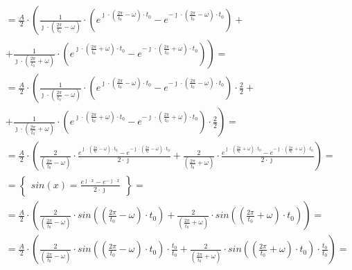 \begin{task}
\begin{align*}
&=\frac{A}{2} \cdot \left(  \frac{1}{\jmath \cdot \left(\frac{2\pi}{t_0} - \omega \right)} \cdot \left( e^{\jmath \cdot \left(\frac{2\pi}{t_0} - \omega \right) \cdot t_0 } - e^{-\jmath \cdot \left(\frac{2\pi}{t_0} - \omega \right) \cdot t_0 } \right) \right.+\\
&\left.+ \frac{1}{\jmath \cdot \left(\frac{2\pi}{t_0} + \omega \right)} \cdot \left(e^{\jmath \cdot \left(\frac{2\pi}{t_0} + \omega \right) \cdot t_0} - e^{-\jmath \cdot \left(\frac{2\pi}{t_0} + \omega \right) \cdot t_0}\right) \right)=\\
&=\frac{A}{2} \cdot \left(  \frac{1}{\jmath \cdot \left(\frac{2\pi}{t_0} - \omega \right)} \cdot \left( e^{\jmath \cdot \left(\frac{2\pi}{t_0} - \omega \right) \cdot t_0 } - e^{-\jmath \cdot \left(\frac{2\pi}{t_0} - \omega \right) \cdot t_0 } \right)\cdot \frac{2}{2} \right.+\\
&\left.+ \frac{1}{\jmath \cdot \left(\frac{2\pi}{t_0} + \omega \right)} \cdot \left(e^{\jmath \cdot \left(\frac{2\pi}{t_0} + \omega \right) \cdot t_0} - e^{-\jmath \cdot \left(\frac{2\pi}{t_0} + \omega \right) \cdot t_0}\right) \cdot \frac{2}{2} \right)=\\%
&=\frac{A}{2} \cdot \left(  \frac{2}{\left(\frac{2\pi}{t_0} - \omega \right)} \cdot \frac{e^{\jmath \cdot \left(\frac{2\pi}{t_0} - \omega \right) \cdot t_0 } - e^{-\jmath \cdot \left(\frac{2\pi}{t_0} - \omega \right) \cdot t_0 } }{2 \cdot \jmath}  + \frac{2}{\left(\frac{2\pi}{t_0} + \omega \right)} \cdot \frac{e^{\jmath \cdot \left(\frac{2\pi}{t_0} + \omega \right) \cdot t_0} - e^{-\jmath \cdot \left(\frac{2\pi}{t_0} + \omega \right) \cdot t_0}}{2\cdot \jmath} \right)=\\
&=\begin{Bmatrix}
sin(x) = \frac{e^{\jmath \cdot x}-e^{-\jmath \cdot x}}{2\cdot \jmath}
\end{Bmatrix}=\\
&=\frac{A}{2} \cdot \left(  \frac{2}{\left(\frac{2\pi}{t_0} - \omega \right)} \cdot sin\left(\left(\frac{2\pi}{t_0} - \omega \right) \cdot t_0 \right)  + \frac{2}{\left(\frac{2\pi}{t_0} + \omega \right)} \cdot sin\left(\left(\frac{2\pi}{t_0} + \omega \right) \cdot t_0 \right) \right)=\\
&=\frac{A}{2} \cdot \left(  \frac{2}{\left(\frac{2\pi}{t_0} - \omega \right)} \cdot sin\left(\left(\frac{2\pi}{t_0} - \omega \right) \cdot t_0 \right)\cdot \frac{t_0}{t_0}  + \frac{2}{\left(\frac{2\pi}{t_0} + \omega \right)} \cdot sin\left(\left(\frac{2\pi}{t_0} + \omega \right) \cdot t_0 \right) \cdot \frac{t_0}{t_0}\right)=\\

\end{align*}
\end{task}
